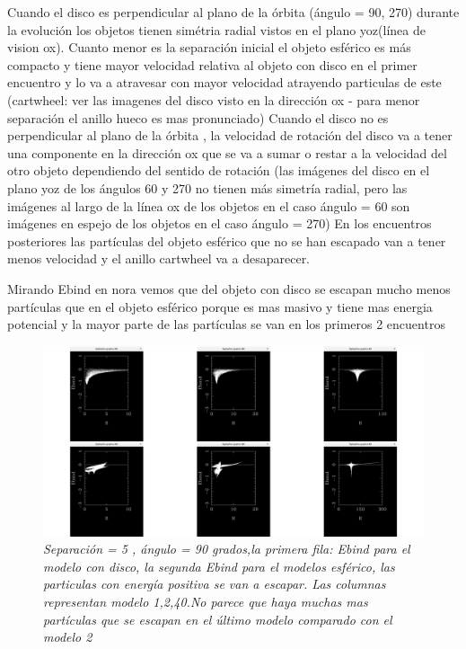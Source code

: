 \documentclass[12pt]{article} %
\renewcommand{\=}[1]{\stackrel{#1}{=}} %
\theoremstyle{definition}
\theoremstyle{remark}
\begin{document}
\clearpage
\newpage

Cuando el disco es perpendicular al plano de la órbita (ángulo = 90, 270) 
durante la evolución los objetos tienen simétria  radial vistos en el plano yoz(línea de vision ox). 
Cuanto menor es la separación inicial el objeto esférico es más compacto y tiene mayor velocidad relativa al objeto con disco en el primer encuentro y lo va a atravesar con mayor velocidad atrayendo particulas de este (cartwheel: ver las imagenes del disco visto en la dirección ox - para menor separación el anillo hueco es mas pronunciado)
Cuando el disco no es perpendicular al plano de la órbita , la velocidad de rotación del disco va a tener una componente en la dirección ox que se va a sumar o restar a la velocidad del otro objeto dependiendo del sentido de rotación (las imágenes del disco en el plano yoz de los ángulos 60 y 270 no tienen más simetría radial, pero las imágenes al largo de la línea ox de los objetos en el caso  ángulo = 60 son imágenes en espejo de los objetos en el caso ángulo = 270) 
En los encuentros posteriores las partículas del objeto esférico que no se han escapado van a tener menos velocidad y el anillo cartwheel va a desaparecer. 

Mirando Ebind en nora vemos que del objeto con disco se escapan mucho menos partículas que en el objeto esférico porque es mas masivo y tiene mas energia potencial y la mayor parte de las partículas se van en los primeros 2 encuentros 

\begin{figure}[!ht]
 \centering
 \includegraphics[scale=0.2]{ebindsep5.png}
 \caption{\emph{ Separación = 5 , ángulo = 90 grados,la primera fila: Ebind para el modelo con disco, la segunda Ebind para el modelos esférico, las particulas con energía positiva se van a escapar. Las columnas representan modelo 1,2,40.No parece que haya muchas mas partículas que se escapan en el último modelo comparado con el modelo 2 }}
\end{figure}
\end{document}
